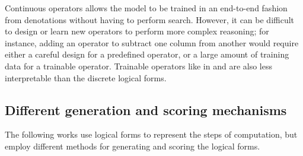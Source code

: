 Continuous operators allows the model to be trained
in an end-to-end fashion from denotations without having to
perform search.
However, it can be difficult to design or learn new operators
to perform more complex reasoning;
for instance, adding an operator to subtract one column from another
would require either a careful design for a predefined operator,
or a large amount of training data for a trainable operator.
Trainable operators like in \citet{yin2016neural}
and \citet{mou2017coupling} are also less interpretable
than the discrete logical forms.

\subsection{Different generation and scoring mechanisms}

The following works use logical forms to represent
the steps of computation,
but employ different methods for generating
and scoring the logical forms.

